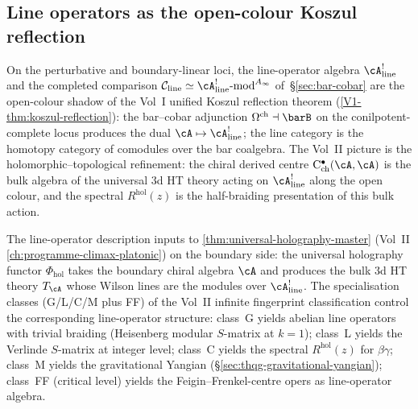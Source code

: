 \subsection{Line operators as the open-colour Koszul reflection}
\label{subsec:line-operators-koszul-reflection-anchor}

\begin{remark}
\label{rem:line-operators-koszul-reflection}
On the perturbative and boundary-linear loci, the line-operator
algebra $\cA^!_{\mathrm{line}}$ and the completed comparison
$\mathcal{C}_{\mathrm{line}} \simeq
\cA^!_{\mathrm{line}}\text{-mod}^{A_\infty}$
of~\S\ref{sec:bar-cobar} are the open-colour shadow of the Vol~I
unified Koszul reflection theorem (\cref{V1-thm:koszul-reflection}):
the bar--cobar adjunction $\Omega^{\mathrm{ch}} \dashv \barB$ on the
conilpotent-complete locus produces the dual
$\cA \mapsto \cA^!_{\mathrm{line}}$; the line category is the
homotopy category of comodules over the bar coalgebra. The Vol~II
picture is the holomorphic--topological refinement: the chiral
derived centre $\mathrm{C}^\bullet_{\mathrm{ch}}(\cA,\cA)$ is the
bulk algebra of the universal $3$d HT theory acting on
$\cA^!_{\mathrm{line}}$ along the open colour, and the spectral
$R^{\mathrm{hol}}(z)$ is the half-braiding presentation of this
bulk action.
\end{remark}

\begin{remark}
\label{rem:line-operators-uhm-bridge}
The line-operator description inputs to
\cref{thm:universal-holography-master} (Vol~II
\cref{ch:programme-climax-platonic}) on the boundary side: the
universal holography functor $\Phi_{\mathrm{hol}}$ takes the boundary
chiral algebra $\cA$ and produces the bulk $3$d HT theory $T_\cA$
whose Wilson lines are the modules over $\cA^!_{\mathrm{line}}$.
The specialisation classes (G/L/C/M plus FF) of the Vol~II infinite
fingerprint classification control the corresponding line-operator
structure: class~G yields abelian line operators with trivial
braiding (Heisenberg modular $S$-matrix at $k=1$); class~L yields
the Verlinde $S$-matrix at integer level; class~C yields the
spectral $R^{\mathrm{hol}}(z)$ for $\beta\gamma$; class~M yields the
gravitational Yangian (\S\ref{sec:thqg-gravitational-yangian});
class~FF (critical level) yields the Feigin--Frenkel-centre opers
as line-operator algebra.
\end{remark}


